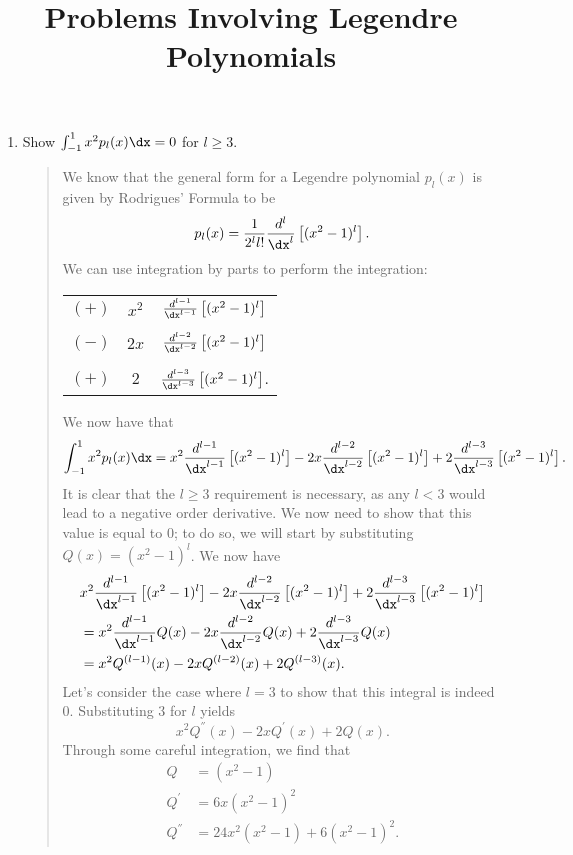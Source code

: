 \documentclass{hw}
\title{Problems Involving Legendre Polynomials}
\date{}
\begin{document}
\maketitle
\begin{enumerate}
\item Show $\int_{-1}^{1}x^2p_{l}(x)\dx = 0$ for $l\geq 3$.
\begin{quote}
We know that the general form for a Legendre polynomial $p_{l}(x)$ is given by Rodrigues' Formula to be
\[
p_{l}(x)={1\over2^ll!}{d^l\over \dx^l}\left[(x^2-1)^l\right].
\]
We can use integration by parts to perform the integration:\\
\begin{center}
\begin{tabular}{c c c}
$(+)$ & $x^2$ & ${d^{l-1}\over\dx^{l-1}}\left[(x^2-1)^l\right]$\\
& & \\
$(-)$ & $2x$ & ${d^{l-2}\over\dx^{l-2}}\left[(x^2-1)^l\right]$\\
& & \\
$(+)$ & $2$ & ${d^{l-3}\over\dx^{l-3}}\left[(x^2-1)^l\right]$.\\
\end{tabular}
\end{center}
We now have that
\[
\int_{-1}^{1}x^2p_{l}(x)\dx =
x^2{d^{l-1}\over\dx^{l-1}}\left[(x^2-1)^l\right] -
2x{d^{l-2}\over\dx^{l-2}}\left[(x^2-1)^l\right] +
2{d^{l-3}\over\dx^{l-3}}\left[(x^2-1)^l\right].
\]
It is clear that the $l\geq3$ requirement is necessary, as any $l<3$ would lead to a negative
order derivative. We now need to show that this value is equal to 0; to do so, we will start by
substituting $Q(x) = (x^2-1)^l$. We now have
\begin{align*}
&x^2{d^{l-1}\over\dx^{l-1}}\left[(x^2-1)^l\right] -
2x{d^{l-2}\over\dx^{l-2}}\left[(x^2-1)^l\right] +
2{d^{l-3}\over\dx^{l-3}}\left[(x^2-1)^l\right]\\
&= x^2{d^{l-1}\over\dx^{l-1}}Q(x) - 2x{d^{l-2}\over\dx^{l-2}}Q(x) + 2{d^{l-3}\over\dx^{l-3}}Q(x)\\
&= x^2Q^{(l-1)}(x) - 2xQ^{(l-2)}(x) + 2Q^{(l-3)}(x).
\end{align*}
Let's consider the case where $l=3$ to show that this integral is indeed 0. Substituting 3 for $l$ yields
\[
x^2Q^{''}(x) - 2xQ^{'}(x) + 2Q(x).
\]
Through some careful integration, we find that
\begin{align*}
Q &= (x^2-1)\\
Q^{'} &= 6x(x^2-1)^2\\
Q^{''} &= 24x^2(x^2-1)+6(x^2-1)^2.

\end{align*}
\end{quote}
\end{enumerate}
\end{document}
